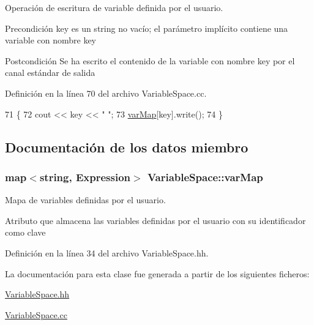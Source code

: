 Operación de escritura de variable definida por el usuario. 

\begin{DoxyPrecond}{Precondición}
\textquotesingle{}key\textquotesingle{} es un string no vacío; el parámetro implícito contiene una variable con nombre \textquotesingle{}key\textquotesingle{} 
\end{DoxyPrecond}
\begin{DoxyPostcond}{Postcondición}
Se ha escrito el contenido de la variable con nombre \textquotesingle{}key\textquotesingle{} por el canal estándar de salida 
\end{DoxyPostcond}


Definición en la línea 70 del archivo Variable\+Space.\+cc.


\begin{DoxyCode}
71 \{
72   cout << key << \textcolor{stringliteral}{" "};
73   \hyperlink{class_variable_space_a5af4ff4cfb476da8de2ffd88e511dd01}{varMap}[key].write();
74 \}
\end{DoxyCode}


\subsection{Documentación de los datos miembro}
\subsubsection[{\texorpdfstring{var\+Map}{varMap}}]{\setlength{\rightskip}{0pt plus 5cm}map$<$string, {\bf Expression}$>$ Variable\+Space\+::var\+Map\hspace{0.3cm}{\ttfamily [private]}}\hypertarget{class_variable_space_a5af4ff4cfb476da8de2ffd88e511dd01}{}\label{class_variable_space_a5af4ff4cfb476da8de2ffd88e511dd01}


Mapa de variables definidas por el usuario. 

Atributo que almacena las variables definidas por el usuario con su identificador como clave 

Definición en la línea 34 del archivo Variable\+Space.\+hh.



La documentación para esta clase fue generada a partir de los siguientes ficheros\+:\begin{DoxyCompactItemize}
\item 
\hyperlink{_variable_space_8hh}{Variable\+Space.\+hh}\item 
\hyperlink{_variable_space_8cc}{Variable\+Space.\+cc}\end{DoxyCompactItemize}
